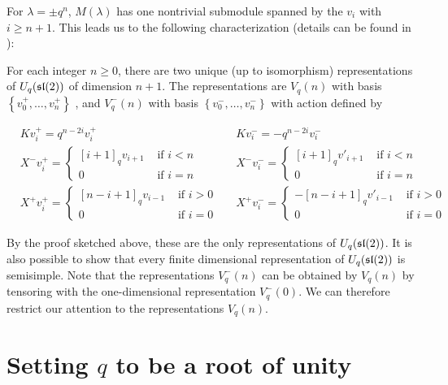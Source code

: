 For $\lambda = \pm q^{n}$, $M(\lambda)$ has one nontrivial submodule spanned by the $v_i$ with $i \geq n+1$.
This leads us to the following characterization (details can be found in \cite{Jantzen1996}):


For each integer $n \geq 0$, there are two unique (up to isomorphism)
representations of $U_q(\mathfrak{sl}(2))$ of dimension $n+1$. 
The representations are $V_q(n)$ with basis $\left\{ v^+_0, \ldots, v^+_n
\right\}$ , and $V_q^-(n)$ with basis $\left\{ v^-_0, \ldots, v^-_n \right\}$
with action defined by 

\begin{align*}
    &K v^+_i = q^{n-2i} v^+_i  &
    &K v^-_i = -q^{n-2i} v^-_i \\
    &X^- v^+_i = \begin{cases} [i+1]_qv_{i+1}& \text{ if $i < n$} \\ 0& \text{ if $i = n$} \end{cases} &
    &X^- v^-_i = \begin{cases} [i+1]_qv'_{i+1}& \text{ if $i < n$} \\ 0& \text{ if $i = n$} \end{cases} \\
    & X^+  v^+_i = \begin{cases} 
                     [n-i+1]_qv_{i-1}& \text{ if $i > 0$} \\ 
                    0& \text{ if $i = 0$} 
             \end{cases} &
    & X^+  v^-_i = \begin{cases} 
                    -[n-i+1]_q v'_{i-1}& \text{ if $i > 0$} \\ 
                    0& \text{ if $i = 0$} 
             \end{cases}
\end{align*}

By the proof sketched above, these are the only representations of
$U_q(\mathfrak{sl}(2))$. It is also possible to show that every finite dimensional
representation of $U_q(\mathfrak{sl}(2))$ is semisimple.  Note that the representations
$V_q^-(n)$ can be obtained by $V_q(n)$ by tensoring with the one-dimensional
representation $V_q^-(0)$. We can therefore restrict our attention to the
representations $V_q(n)$.

\section{Setting $q$ to be a root of unity}

